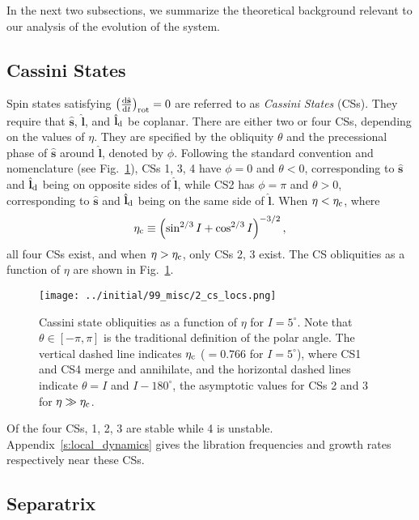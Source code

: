 \documentclass[
        fleqn,
        usenatbib,
        referee,
    ]{mnras}
\newcommand*{\rd}[2]{\frac{\mathrm{d}#1}{\mathrm{d}#2}}
\newcommand*{\bm}[1]{\boldsymbol{\mathbf{#1}}}
\newcommand*{\uv}[1]{\hat{\bm{#1}}}
\newcommand*{\p}[1]{\left(#1\right)}
\begin{document}
In the next two subsections, we summarize the theoretical background relevant to
our analysis of the evolution of the system.

\subsection{Cassini States}\label{ss:cs}

Spin states satisfying $\p{\rd{\uv{s}}{t}}_{\rm rot} = 0$ are referred to as
\emph{Cassini States} (CSs). They require that $\uv{s}$, $\uv{l}$, and
$\uv{l}_{\rm d}$ be coplanar. There are either two or four CSs, depending
on the values of $\eta$. They are specified by the obliquity $\theta$ and the
precessional phase of $\uv{s}$ around $\uv{l}$, denoted by $\phi$. Following
the standard convention and nomenclature (see Fig.~\ref{fig:cs_locs}), CSs 1, 3, 4
have $\phi = 0$ and $\theta < 0$, corresponding to $\uv{s}$ and $\uv{l}_{\rm
d}$ being on opposite sides of $\uv{l}$, while CS2 has $\phi = \pi$ and $\theta
> 0$, corresponding to $\uv{s}$ and $\uv{l}_{\rm d}$ being on the same side of
$\uv{l}$. When $\eta < \eta_{\rm c}$, where
\begin{equation}
    \eta_{\rm c} \equiv \p{\sin^{2/3}I + \cos^{2/3}I}^{-3/2},\label{eq:etac}
\end{equation}
all four CSs exist, and when $\eta > \eta_{\rm c}$, only CSs 2, 3 exist. The CS
obliquities as a function of $\eta$ are shown in Fig.~\ref{fig:cs_locs}.
\begin{figure}
    \centering
    \texttt{[image: ../initial/99\_misc/2\_cs\_locs.png]}
    \caption{Cassini state obliquities as a function of $\eta$ for $I =
    5^\circ$. Note that $\theta \in [-\pi, \pi]$ is the traditional definition
    of the polar angle. The vertical dashed line indicates $\eta_{\rm c}$ ($=
    0.766$ for $I = 5^\circ$), where CS1 and CS4 merge and annihilate, and the
    horizontal dashed lines indicate $\theta = I$ and $I - 180^\circ$, the
    asymptotic values for CSs 2 and 3 for $\eta \gg \eta_{\rm
    c}$.}\label{fig:cs_locs}
\end{figure}

Of the four CSs, 1, 2, 3 are stable while 4 is unstable.
Appendix~\ref{s:local_dynamics} gives the libration frequencies and growth rates
respectively near these CSs.

\subsection{Separatrix}
\end{document}
